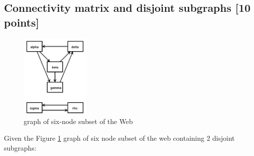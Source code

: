 \documentclass[unicode,11pt,a4paper,oneside,numbers=endperiod,openany]{scrartcl}
\begin{document}
\cleardoublepage

\subsection{Connectivity matrix and disjoint subgraphs [10 points]}

\begin{figure}[H]
    \centering
    \includegraphics[width=0.3\textwidth]{figures/graph_disjoint}
    \caption{graph of six-node subset of the Web}
    \label{fig:graph_disjoint}
\end{figure}

Given the Figure \ref{fig:graph_disjoint} graph of six node subset of the web containing 2 disjoint subgraphs: \\
\end{document}
